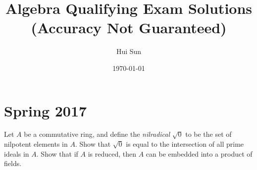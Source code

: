 \documentclass[openany]{book}
\title{Algebra Qualifying Exam Solutions
\\ 
\vspace{0.4cm}
\Large (Accuracy Not Guaranteed)}
\date{\today}
\author{Hui Sun}
\begin{document}
\maketitle

\tableofcontents
\newpage


\chapter{Spring 2017}


\begin{prob}
    Let \(A\) be a commutative ring, and define the \textit{nilradical} \(\sqrt{0}\) to be the set of nilpotent elements in \(A\). Show that \(\sqrt{0}\) is equal to the intersection of all prime ideals in \(A\). Show that if \(A\) is reduced, then \(A\) can be embedded into a product of fields.
\end{prob}
\end{document}
